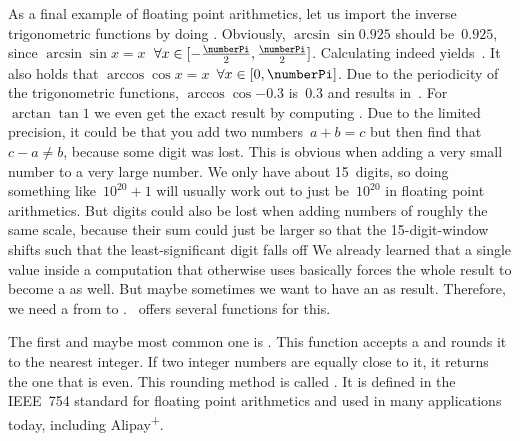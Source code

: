 As a final example of floating point arithmetics, let us import the inverse trigonometric functions by doing .
Obviously, $\arcsin{\sin{0.925}}$ should be~$0.925$, since $\arcsin{\sin x} = x$~$\forall x\in[-\frac{\numberPi}{2},\frac{\numberPi}{2}]$.
Calculating  indeed yields~.
It also holds that $\arccos{\cos x} = x$~$\forall x\in[0,\numberPi]$.
Due to the periodicity of the trigonometric functions, $\arccos{\cos{-0.3}}$ is~$0.3$ and  results in~.
For $\arctan{\tan{1}}$ we even get the exact result  by computing .%
%
%
%
Due to the limited precision, it could be that you add two numbers~$a+b=c$ but then find that $c-a\neq b$, because some digit was lost. %
This is obvious when adding a very small number to a very large number.
We only have about 15~digits, so doing something like~$10^{20} + 1$ will usually work out to just be~$10^{20}$ in floating point arithmetics.
But digits could also be lost when adding numbers of roughly the same scale, because their sum could just be larger so that the 15-digit-window shifts such that the least-significant digit falls off%
%
\FloatBarrier%
\endhsection%
%
%
%
%
%
%
We already learned that a single  value inside a computation that otherwise uses  basically forces the whole result to become a  as well.
But maybe sometimes we want to have an  as result.
Therefore, we need a  from  to .
\python\ offers several functions for this.

The first and maybe most common one is .
This function accepts a  and rounds it to the nearest integer.
If two integer numbers are equally close to it, it returns the one that is even.
This rounding method is called \emph{}.
It is defined in the IEEE~754 standard for floating point arithmetics and used in many applications today, including Alipay\textsuperscript{+}.


